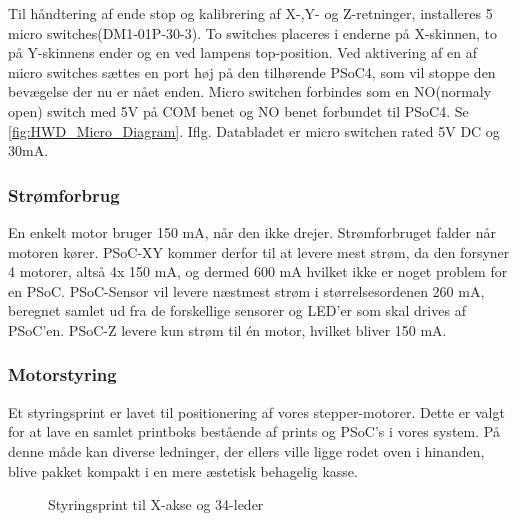 Til håndtering af ende stop og kalibrering af X-,Y- og Z-retninger, installeres 5 micro switches(DM1-01P-30-3). To switches placeres i enderne på X-skinnen, to på Y-skinnens ender og en ved lampens top-position. Ved aktivering af en af micro switches sættes en port høj på den tilhørende PSoC4, som vil stoppe den bevægelse der nu er nået enden.
Micro switchen forbindes som en NO(normaly open) switch med 5V på COM benet og NO benet forbundet til PSoC4. Se \ref{fig:HWD_Micro_Diagram}.
Iflg. Databladet er micro switchen rated 5V DC og 30mA.

\subsubsection{Strømforbrug}

En enkelt motor bruger 150 mA, når den ikke drejer. Strømforbruget falder når motoren kører. PSoC-XY kommer derfor til at levere mest strøm, da den forsyner 4 motorer, altså 4x 150 mA, og dermed 600 mA hvilket ikke er noget problem for en PSoC. PSoC-Sensor vil levere næstmest strøm i størrelsesordenen 260 mA, beregnet samlet ud fra de forskellige sensorer og LED’er som skal drives af PSoC’en. PSoC-Z levere kun strøm til én motor, hvilket bliver 150 mA.

\subsubsection{Motorstyring}

Et styringsprint er lavet til positionering af vores stepper-motorer. Dette er valgt for at lave en samlet printboks bestående af prints og PSoC’s i vores system. På denne måde kan diverse ledninger, der ellers ville ligge rodet oven i hinanden, blive pakket kompakt i en mere æstetisk behagelig kasse.

\begin{figure}[H] \centering
    \caption{Styringsprint til X-akse og 34-leder}
    \label{fig:HWD_Styringsprint_til_x_print}
\end{figure}


